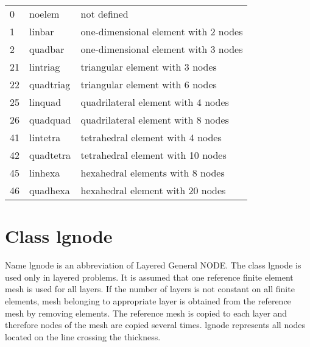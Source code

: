 \begin{center}
\begin{tabular}{lll}
0 & noelem & not defined
\\
1 & linbar & one-dimensional element with 2 nodes
\\
2 & quadbar & one-dimensional element with 3 nodes
\\
21 & lintriag & triangular element with 3 nodes
\\
22 & quadtriag & triangular element with 6 nodes
\\
25 & linquad & quadrilateral element with 4 nodes
\\
26 & quadquad & quadrilateral element with 8 nodes
\\
41 & lintetra & tetrahedral element with 4 nodes
\\
42 & quadtetra & tetrahedral element with 10 nodes
\\
45 & linhexa & hexahedral elements with 8 nodes
\\
46 & quadhexa & hexahedral element with 20 nodes
\\
\end{tabular}
\end{center}

\section{Class {\sf lgnode}}
\label{gtopologylgnode}
Name {\sf lgnode} is an abbreviation of Layered General NODE. The class {\sf lgnode} is used only in layered problems.
It is assumed that one reference finite element mesh is used for all layers. If the number of layers is not constant
on all finite elements, mesh belonging to appropriate layer is obtained from the reference mesh by removing
elements. The reference mesh is copied to each layer and therefore nodes of the mesh are copied several times.
{\sf lgnode} represents all nodes located on the line crossing the thickness.
